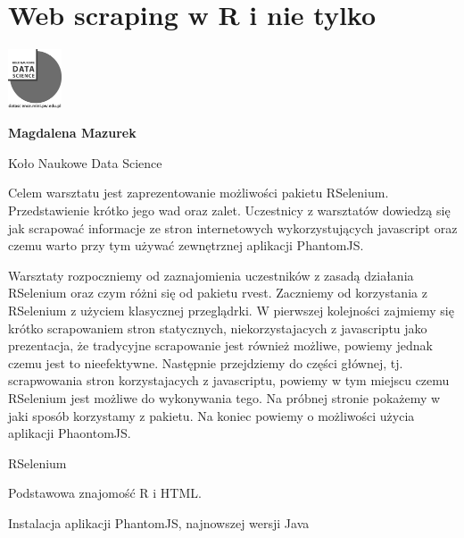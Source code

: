 \documentclass[\main/boa.tex]{subfiles}
\begin{document}
\section{Web scraping w R i nie tylko}
\begin{minipage}[t]{0.915\textwidth}
	\center     
    \includegraphics[width=60px]{img/workshops/czarno_biale/knds_logo.png} 
\end{minipage}

\begin{minipage}{0.915\textwidth}
\centering
{\bf {} Magdalena Mazurek}
\end{minipage}

\vskip 0.3cm

\begin{affiliations}
\begin{minipage}{0.915\textwidth}
\centering
\large Koło Naukowe Data Science  \\[2pt]
\end{minipage}
\end{affiliations}

\vskip 0.8cm

\opiswarsztatu Celem warsztatu jest zaprezentowanie możliwości pakietu RSelenium. Przedstawienie krótko jego wad oraz zalet. Uczestnicy z warsztatów dowiedzą się jak scrapować informacje ze stron internetowych wykorzystujących javascript oraz czemu warto przy tym używać zewnętrznej aplikacji PhantomJS.

\planwarsztatu
Warsztaty rozpoczniemy od zaznajomienia uczestników z zasadą działania RSelenium oraz czym różni się od pakietu rvest. Zaczniemy od korzystania z RSelenium z użyciem klasycznej przeglądrki. W pierwszej kolejności zajmiemy się krótko scrapowaniem stron statycznych, niekorzystajacych z javascriptu jako prezentacja, że tradycyjne scrapowanie jest również możliwe, powiemy jednak czemu jest to nieefektywne. Następnie przejdziemy do części głównej, tj. scrapwowania stron korzystajacych z javascriptu, powiemy w tym miejscu czemu RSelenium jest możliwe do wykonywania tego. Na próbnej stronie pokażemy w jaki sposób korzystamy z pakietu. Na koniec powiemy o możliwości użycia aplikacji PhaontomJS.	 

\pakiety RSelenium

\umiejetnosci Podstawowa znajomość R i HTML.

\wymagania Instalacja aplikacji PhantomJS, najnowszej wersji Java
\end{document}
